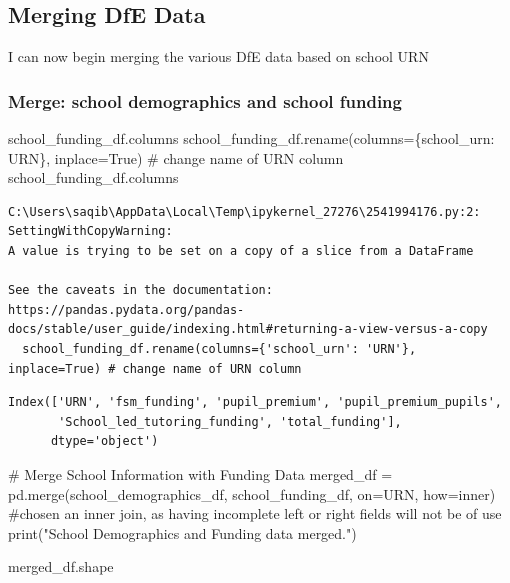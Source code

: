 \documentclass[
  letterpaper,
  DIV=11,
  numbers=noendperiod]{scrartcl}
\newenvironment{Shaded}{\begin{snugshade}}{\end{snugshade}}
\newcommand{\BuiltInTok}[1]{\textcolor[rgb]{0.00,0.23,0.31}{#1}}
\newcommand{\CommentTok}[1]{\textcolor[rgb]{0.37,0.37,0.37}{#1}}
\newcommand{\NormalTok}[1]{\textcolor[rgb]{0.00,0.23,0.31}{#1}}
\newcommand{\OperatorTok}[1]{\textcolor[rgb]{0.37,0.37,0.37}{#1}}
\newcommand{\StringTok}[1]{\textcolor[rgb]{0.13,0.47,0.30}{#1}}
\newcommand{\VariableTok}[1]{\textcolor[rgb]{0.07,0.07,0.07}{#1}}
\begin{document}
\subsection{Merging DfE Data}\label{merging-dfe-data}

I can now begin merging the various DfE data based on school URN

\subsubsection{Merge: school demographics and school
funding}\label{merge-school-demographics-and-school-funding}

\begin{Shaded}
\begin{Highlighting}[]
\NormalTok{school\_funding\_df.columns}
\NormalTok{school\_funding\_df.rename(columns}\OperatorTok{=}\NormalTok{\{}\StringTok{\textquotesingle{}school\_urn\textquotesingle{}}\NormalTok{: }\StringTok{\textquotesingle{}URN\textquotesingle{}}\NormalTok{\}, inplace}\OperatorTok{=}\VariableTok{True}\NormalTok{) }\CommentTok{\# change name of URN column}
\NormalTok{school\_funding\_df.columns}
\end{Highlighting}
\end{Shaded}

\begin{verbatim}
C:\Users\saqib\AppData\Local\Temp\ipykernel_27276\2541994176.py:2: SettingWithCopyWarning: 
A value is trying to be set on a copy of a slice from a DataFrame

See the caveats in the documentation: https://pandas.pydata.org/pandas-docs/stable/user_guide/indexing.html#returning-a-view-versus-a-copy
  school_funding_df.rename(columns={'school_urn': 'URN'}, inplace=True) # change name of URN column
\end{verbatim}

\begin{verbatim}
Index(['URN', 'fsm_funding', 'pupil_premium', 'pupil_premium_pupils',
       'School_led_tutoring_funding', 'total_funding'],
      dtype='object')
\end{verbatim}

\begin{Shaded}
\begin{Highlighting}[]

\CommentTok{\# Merge School Information with Funding Data}
\NormalTok{merged\_df }\OperatorTok{=}\NormalTok{ pd.merge(school\_demographics\_df, school\_funding\_df, on}\OperatorTok{=}\StringTok{\textquotesingle{}URN\textquotesingle{}}\NormalTok{, how}\OperatorTok{=}\StringTok{\textquotesingle{}inner\textquotesingle{}}\NormalTok{) }
\CommentTok{\#chosen an inner join, as having incomplete left or right fields will not be of use}
\BuiltInTok{print}\NormalTok{(}\StringTok{"School Demographics and Funding data merged."}\NormalTok{)}

\NormalTok{merged\_df.shape}
\end{Highlighting}
\end{Shaded}
\end{document}
